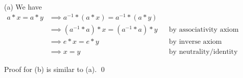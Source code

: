 
(a)
We have
\begin{align*}
a * x = a * y
&\implies a^{-1} * (a * x) = a^{-1} * (a * y) \\
&\implies (a^{-1} * a) * x = (a^{-1} * a) * y & & \text{by associativity axiom} \\
&\implies e * x = e * y                     & & \text{by inverse axiom} \\
&\implies x = y                             & & \text{by neutrality/identity axiom}
\end{align*}

Proof for (b) is similar to (a).
\qed
